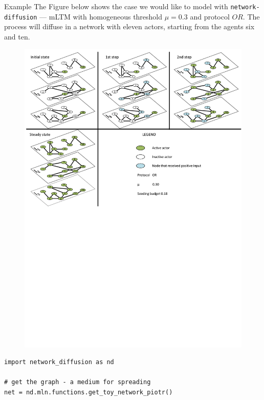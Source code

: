 \documentclass[final]{beamer}
\newlength{\colwidth}
\begin{document}
\begin{frame}[t, fragile]
\begin{columns}[t]
\begin{column}{\colwidth}
\begin{exampleblock}{Example}
The Figure below shows the case we would like to model with \lstinline[style=py]{network-diffusion} 
--- mLTM with homogeneous threshold $\mu=0.3$ and protocol $OR$. The process will diffuse in a
network with eleven actors, starting from the agents six and ten.
\begin{figure}
    \centering
    \includegraphics[width=1\linewidth]{../presentation/figures/ltm_example_or.pdf}
\end{figure}


\begin{lstlisting}[style=py, basicstyle=\footnotesize\ttfamily]
import network_diffusion as nd

# get the graph - a medium for spreading
net = nd.mln.functions.get_toy_network_piotr()


\end{lstlisting}
\end{exampleblock}
\end{column}
\end{columns}
\end{frame}
\end{document}
